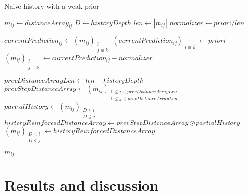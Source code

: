 \documentclass[10pt,letterpaper]{article}
\newif\ifhighlight
\newcommand{\hlb}[1]{\ifhighlight{\hl{#1}}\else{#1}\fi}
\begin{document}
\begin{algorithm}[H]
  \caption{Naive history with a weak prior}\label{alg:three}
  $m_{ij} \gets distanceArray_{ij}$\;
  $D \gets historyDepth$\;
  $len \gets |m_{ij}|$\;
  $normalizer \gets priori/ len$\;
  
   {
      $currentPrediction_{ij} \gets (m_{ij})_{\substack{i\\ j \equiv k }}$\;
      $ (currentPrediction_{ij})_{\substack{i \equiv k}} \gets priori$\;
      $(m_{ij})_{\substack{i\\ j \equiv k }} \gets currentPrediction_{ij} - normalizer$\;
  }
  
   {
      $prevDistanceArrayLen \gets len - historyDepth$\;
      $prevStepDistanceArray \gets (m_{ij})_{\substack{1\le i < prevDistanceArrayLen \\ 1\le j < prevDistanceArrayLen }}$\;
      $partialHistory \gets (m_{ij})_{\substack{D \le i \\ D \le j}}$\;
      $historyReinforcedDistanceArray \gets prevStepDistanceArray \odot partialHistory$\;
      $(m_{ij})_{\substack{D \le i \\ D \le j}} \gets historyReinforcedDistanceArray$\;
  }
  
  \Return $m_{ij}$\;
\end{algorithm}
\FloatBarrier

\section*{Results \hlb{and discussion}}
\end{document}
